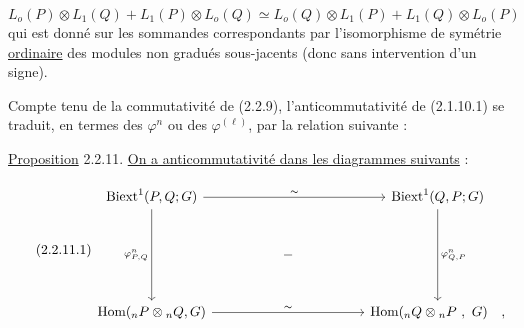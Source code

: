 \begin{equation*}
L_o(P) \otimes L_1(Q) + L_1(P) \otimes L_o(Q) \simeq L_o(Q) \otimes L_1(P) + L_1(Q) \otimes L_o(P)
\end{equation*}
qui est donné sur les sommandes correspondants par l'isomorphisme de
symétrie \underline{ordinaire} des modules non gradués sous-jacents (donc sans intervention d'un signe).

Compte tenu de la commutativité de (2.2.9), l'anticommutativité de (2.1.10.1) se traduit, en termes des $\varphi^n$ ou des $\varphi^{(\ell)}$, par la relation suivante :

\underline{Proposition} 2.2.11. \underline{On a anticommutativité dans les diagrammes suivants} :

\begin{equation}\tag{2.2.11.1}
\begin{tikzcd}[row sep=large, column sep=huge]
\mathrm{Biext}^1(P,Q;G) \arrow[rr, "\sim"] \arrow[dd, "{\varphi^n_{P,Q}}"'] & & \mathrm{Biext}^1(Q,P;G) \arrow[dd, "{\varphi^n_{Q,P}}"] \\
& - & \\
\mathrm{Hom}({}_nP \otimes {}_nQ,G) \arrow[rr, "\sim"] & & \mathrm{Hom}({}_nQ \otimes {}_nP\ ,\ G) \quad ,
\end{tikzcd}
\end{equation}
